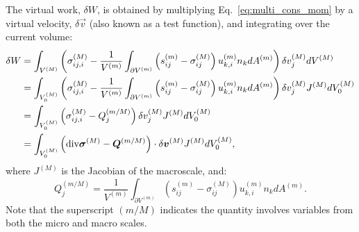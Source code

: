 The virtual work, $\delta W$, is obtained by multiplying Eq.\ \eqref{eq:multi_cons_mom} by a virtual velocity, $\delta \vec{v}$ (also known as a test function), and integrating over the current volume:
%
\begin{align}
\delta W &= \int_{V^{(M)}} \left(\sigma_{ij,i}^{(M)} - \frac{1}{V^{(m)}} \int_{\partial V^{(m)}} \left( s_{ij}^{(m)} - \sigma_{ij}^{(M)} \right)u_{k,i}^{(m)} n_k dA^{(m)} \right)  \delta v_j^{(M)}  dV^{(M)} \nonumber\\
%
&= \int_{V_0^{(M)}} \left(\sigma_{ij,i}^{(M)} - \frac{1}{V^{(m)}} \int_{\partial V^{(m)}} \left( s_{ij}^{(m)} - \sigma_{ij}^{(M)} \right)u_{k,i}^{(m)} n_k dA^{(m)} \right)  \delta v_j^{(M)}J^{(M)} dV_0^{(M)}  \nonumber\\
%
&= \int_{V_0^{(M)}} \left(\sigma_{ij,i}^{(M)} - Q_j^{(m/M)} \right) \delta v_j^{(M)}J^{(M)} dV_0^{(M)}   \nonumber\\
%
&= \int_{V_0^{(M)}} \left(\text{div}\mat{\sigma}^{(M)} - \vec{Q}^{(m/M)} \right)  \cdot \delta \vec{v}^{(M)}J^{(M)} dV_0^{(M)} ,
\label{eq:virtual_work}
\end{align}
%
where \(J^{(M)}\) is the Jacobian of the macroscale, and:
%
\begin{equation}
Q_j^{(m/M)} = \frac{1}{V^{(m)}} \int_{\partial V^{(m)}} \left( s_{ij}^{(m)} - \sigma_{ij}^{(M)} \right)u_{k,i}^{(m)} n_k dA^{(m)}.
\end{equation}
%
Note that the superscript $(m/M)$ indicates the quantity involves variables from both the micro and macro scales. 

